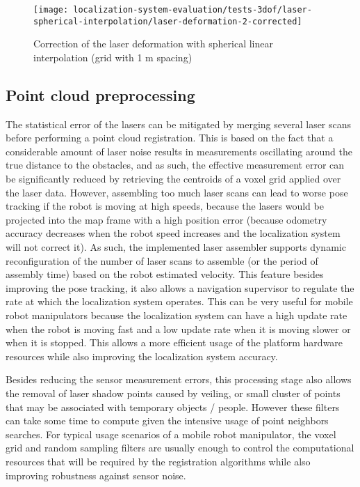 \begin{figure}[H]
	\centering
	\texttt{[image: localization-system-evaluation/tests-3dof/laser-spherical-interpolation/laser-deformation-2-corrected]}
	\caption{Correction of the laser deformation with spherical linear interpolation  (grid with 1 m spacing)}
	\label{fig:localization-system-evaluation_laser-deformation-2-corrected}
\end{figure}



\subsection{Point cloud preprocessing}

The statistical error of the lasers can be mitigated by merging several laser scans before performing a point cloud registration. This is based on the fact that a considerable amount of laser noise results in measurements oscillating around the true distance to the obstacles, and as such, the effective measurement error can be significantly reduced by retrieving the centroids of a voxel grid applied over the laser data. However, assembling too much laser scans can lead to worse pose tracking if the robot is moving at high speeds, because the lasers would be projected into the map frame with a high position error (because odometry accuracy decreases when the robot speed increases and the localization system will not correct it). As such, the implemented laser assembler supports dynamic reconfiguration of the number of laser scans to assemble (or the period of assembly time) based on the robot estimated velocity. This feature besides improving the pose tracking, it also allows a navigation supervisor to regulate the rate at which the localization system operates. This can be very useful for mobile robot manipulators because the localization system can have a high update rate when the robot is moving fast and a low update rate when it is moving slower or when it is stopped. This allows a more efficient usage of the platform hardware resources while also improving the localization system accuracy.

Besides reducing the sensor measurement errors, this processing stage also allows the removal of laser shadow points caused by veiling, or small cluster of points that may be associated with temporary objects / people. However these filters can take some time to compute given the intensive usage of point neighbors searches. For typical usage scenarios of a mobile robot manipulator, the voxel grid and random sampling filters are usually enough to control the computational resources that will be required by the registration algorithms while also improving robustness against sensor noise.



